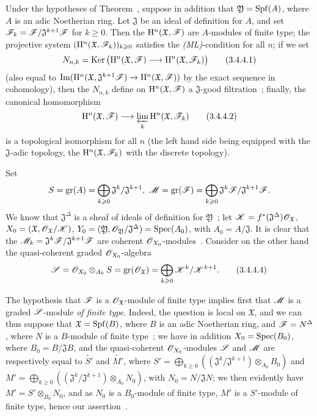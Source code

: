 \begin{corollary}[3.4.4]
\label{3.3.4.4}
Under the hypotheses of Theorem~, suppose in addition that $\mathfrak{Y}=\operatorname{Spf}(A)$, where $A$ is an adic Noetherian ring.
Let $\mathfrak{J}$ be an ideal of definition for $A$, and set $\mathscr{F}_k=\mathscr{F}/\mathfrak{J}^{k+1}\mathscr{F}$ for $k\geq 0$.
Then the $\mathrm{H}^n(\mathfrak{X},\mathscr{F})$ are $A$-modules of finite type; the projective system $(\mathrm{H}^n(\mathfrak{X},\mathscr{F}_k))_{k\geqslant 0}$ satisfies the \emph{(ML)}-condition for all $n$; if we set
\[
\label{3.3.4.4.1}
  N_{n,k}=\Ker\big(\HH^n(\mathfrak{X},\sh{F})\to\HH^n(\mathfrak{X},\sh{F}_k)\big)
  \tag{3.4.4.1}
\]
(also equal to $\Im(\HH^n(\mathfrak{X},\mathfrak{J}^{k+1}\sh{F})\to\HH^n(\mathfrak{X},\sh{F}))$ by the exact sequence in cohomology), then the $N_{n,k}$ define on $\mathrm{H}^n(\mathfrak{X},\mathscr{F})$ a $\mathfrak{J}$-good filtration~; finally, the canonical homomorphism
\[
\label{3.3.4.4.2}
  \HH^n(\mathfrak{X},\sh{F})\to\varprojlim_k\HH^n(\mathfrak{X},\sh{F}_k)
  \tag{3.4.4.2}
\]
is a topological isomorphism for all $n$ (the left hand side being equipped with the $\mathfrak{J}$-adic topology, the $\mathrm{H}^n(\mathfrak{X},\mathscr{F}_k)$ with the discrete topology).
\end{corollary}

Set
\[
\label{3.3.4.4.3}
  S=\gr(A)=\bigoplus_{k\geq 0}\mathfrak{J}^k/\mathfrak{J}^{k+1},\ \sh{M}=\gr(\sh{F})=\bigoplus_{k\geq 0}\mathfrak{J}^k\sh{F}/\mathfrak{J}^{k+1}\sh{F}.
\]
We know that $\mathfrak{J}^\Delta$ is a sheaf of ideals of definition for $\mathfrak{Y}$~; let $\mathscr{K}=f^*(\mathfrak{J}^\Delta)\mathscr{O}_\mathfrak{X}$, $X_0=(\mathfrak{X},\mathscr{O}_\mathfrak{X}/\mathscr{K})$, $Y_0=(\mathfrak{Y},\mathscr{O}_\mathfrak{Y}/\mathfrak{J}^\Delta)=\operatorname{Spec}(A_0)$, with $A_0=A/\mathfrak{J}$.
It is clear that the $\mathscr{M}_k=\mathfrak{J}^k\mathscr{F}/\mathfrak{J}^{k+1}\mathscr{F}$ are coherent $\mathscr{O}_{X_0}$-modules~.
Consider on the other hand the quasi-coherent graded $\mathscr{O}_{X_0}$-algebra
\[
\label{3.3.4.4.4}
  \mathscr{S}=\mathscr{O}_{X_0}\otimes_{A_0}S=\operatorname{gr}(\mathscr{O}_\mathfrak{X})=\bigoplus_{k\geqslant 0}\mathscr{K}^k/\mathscr{K}^{k+1}.
  \tag{3.4.4.4}
\]

The hypothesis that $\mathscr{F}$ is a $\mathscr{O}_\mathfrak{X}$-module of finite type implies first that $\mathscr{M}$ is
a graded $\mathscr{S}$-module \emph{of finite type}.
Indeed, the question is local on $\mathfrak{X}$, and we can thus suppose that $\mathfrak{X}=\operatorname{Spf}(B)$, where $B$ is an adic Noetherian ring, and $\mathscr{F}=N^\Delta$, where $N$ is a $B$-module of finite type~; we have in addition $X_0=\operatorname{Spec}(B_0)$, where $B_0=B/\mathfrak{J}B$, and the quasi-coherent $\mathscr{O}_{X_0}$-modules $\mathscr{S}$ and $\mathscr{M}$ are respectively equal to $\widetilde{S'}$ and $\widetilde{M'}$, where $S'=\bigoplus_{k\geq 0}((\mathfrak{J}^k/\mathfrak{J}^{k+1})\otimes_{A_0}B_0)$ and $M'=\bigoplus_{k\geq 0}((\mathfrak{J}^k/\mathfrak{J}^{k+1})\otimes_{A_0}N_0)$, with $N_0=N/\mathfrak{J}N$; we then evidently have $M'=S'\otimes_{B_0}N_0$, and as $N_0$ is a $B_0$-module of finite type, $M'$ is a $S'$-module of finite type, hence our assertion~.

